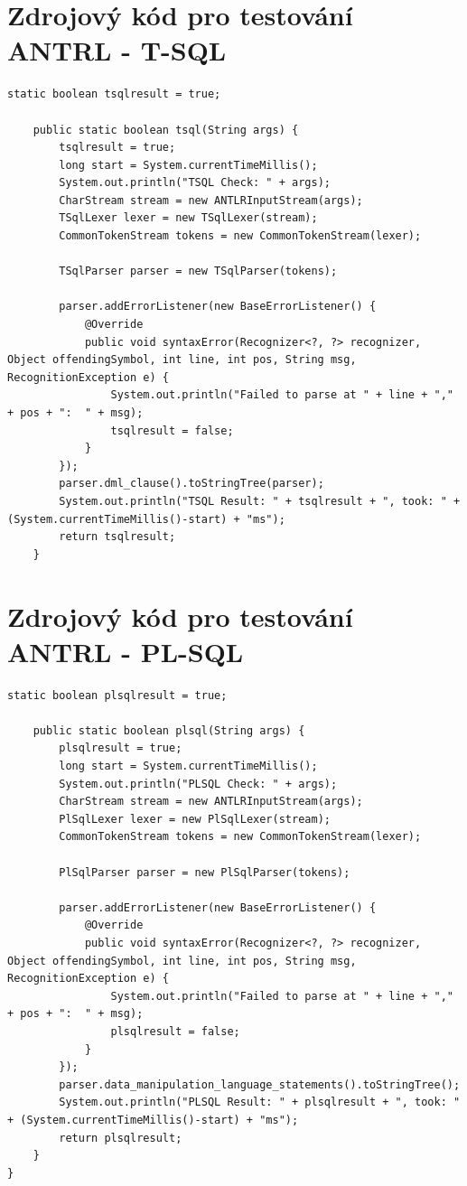\documentclass[czech,bachelor,public,dept460,male,cpdeclaration,twoside]{diploma}
\begin{document}
\section{Zdrojový kód pro testování ANTRL - T-SQL}
\begin{lstlisting}[caption=ANTRL T-SQL]
  static boolean tsqlresult = true;

    public static boolean tsql(String args) {
        tsqlresult = true;
        long start = System.currentTimeMillis();
        System.out.println("TSQL Check: " + args);
        CharStream stream = new ANTLRInputStream(args);
        TSqlLexer lexer = new TSqlLexer(stream);
        CommonTokenStream tokens = new CommonTokenStream(lexer);
        
        TSqlParser parser = new TSqlParser(tokens);

        parser.addErrorListener(new BaseErrorListener() {
            @Override
            public void syntaxError(Recognizer<?, ?> recognizer, Object offendingSymbol, int line, int pos, String msg, RecognitionException e) {
                System.out.println("Failed to parse at " + line + "," + pos + ":  " + msg);
                tsqlresult = false;
            }
        });
        parser.dml_clause().toStringTree(parser);
        System.out.println("TSQL Result: " + tsqlresult + ", took: " + (System.currentTimeMillis()-start) + "ms");
        return tsqlresult;
    }
\end{lstlisting}
\section{Zdrojový kód pro testování ANTRL - PL-SQL}
\begin{lstlisting}[caption=ANTRL PL-SQL]
    static boolean plsqlresult = true;

    public static boolean plsql(String args) {
        plsqlresult = true;
        long start = System.currentTimeMillis();
        System.out.println("PLSQL Check: " + args);
        CharStream stream = new ANTLRInputStream(args);
        PlSqlLexer lexer = new PlSqlLexer(stream);
        CommonTokenStream tokens = new CommonTokenStream(lexer);

        PlSqlParser parser = new PlSqlParser(tokens);

        parser.addErrorListener(new BaseErrorListener() {
            @Override
            public void syntaxError(Recognizer<?, ?> recognizer, Object offendingSymbol, int line, int pos, String msg, RecognitionException e) {
                System.out.println("Failed to parse at " + line + "," + pos + ":  " + msg);
                plsqlresult = false;
            }
        });
        parser.data_manipulation_language_statements().toStringTree();
        System.out.println("PLSQL Result: " + plsqlresult + ", took: " + (System.currentTimeMillis()-start) + "ms");
        return plsqlresult;
    }
}
\end{lstlisting}
\end{document}
